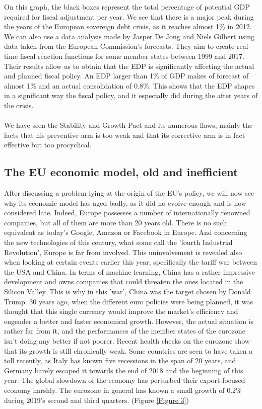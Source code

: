 \documentclass[12pt]{article}
\begin{document}
On this graph, the black boxes represent the total percentage of potential GDP required for fiscal adjustment per year. We see that there is a major peak during the years of the European sovereign debt crisis, as it reaches almost 1\% in 2012. We can also use a data analysis made by Jasper De Jong and Niels Gilbert using data taken from the European Commission's forecasts. They aim to create real-time fiscal reaction functions for some member states between 1999 and 2017. Their results allow us to obtain that the EDP is significantly affecting the actual and planned fiscal policy. An EDP larger than 1\% of GDP makes of forecast of almost 1\% and an actual consolidation of 0.8\%. This shows that the EDP shapes in a significant way the fiscal policy, and it especially did during the after years of the crisis. \\
\\
We have seen the Stability and Growth Pact and its numerous flaws, mainly the facts that his preventive arm is too weak and that its corrective arm is in fact effective but too procyclical.

\subsection{The EU economic model, old and inefficient}

After discussing a problem lying at the origin of the EU's policy, we will now see why its economic model has aged badly, as it did no evolve enough and is now considered late. Indeed, Europe possesses a number of internationally renowned companies, but all of them are more than 20 years old. There is no such equivalent as today's Google, Amazon or Facebook in Europe. And concerning the new technologies of this century, what some call the 'fourth Industrial Revolution', Europe is far from involved. This uninvolvement is revealed also when looking at certain events earlier this year, specifically the tariff war between the USA and China. In terms of machine learning, China has a rather impressive development and owns companies that could threaten the ones located in the Silicon Valley. This is why in this 'war', China was the target chosen by Donald Trump. 30 years ago, when the different euro policies were being planned, it was thought that this single currency would improve the market's efficiency and engender a better and faster economical growth. However, the actual situation is rather far from it, and the performances of the member states of the eurozone isn't doing any better if not poorer. Recent health checks on the eurozone show that its growth is still chronically weak. Some countries are seen to have taken a toll recently, as Italy has known five recessions in the span of 20 years, and Germany barely escaped it towards the end of 2018 and the beginning of this year. The global slowdown of the economy has perturbed their export-focused economy harshly. The eurozone in general has known a small growth of 0.2\% during 2019's second and third quarters. (Figure \ref{Figure 3})
\end{document}
